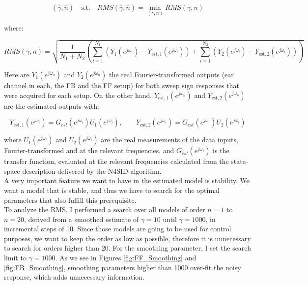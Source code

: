 \[(\hat{\gamma},\hat{n}) \quad\text{s.t.}\quad RMS(\hat{\gamma},\hat{n}) = \min\limits_{(\gamma,n)} RMS(\gamma,n)\]

where:

\[RMS(\gamma,n) = \sqrt{ \frac{1}{N_1 + N_2}\left(\sum\limits_{i=1}^{N_1}(Y_1(e^{j\omega_i})-Y_{\text{est},1}(e^{j\omega_i}))+\sum\limits_{i=1}^{N_2}(Y_2(e^{j\omega_i})-Y_{\text{est},2}(e^{j\omega_i}))\right)}\]

Here are $Y_1(e^{j\omega_n})$ and $Y_2(e^{j\omega_n})$ the real Fourier-transformed outputs (ear channel in each, the FB and the FF setup) for both sweep sign responses that were acquired for each setup. On the other hand, $Y_{\text{est},1}(e^{j\omega_n})$ and $Y_{\text{est},2}(e^{j\omega_n})$ are the estimated outputs with:

\[Y_{\text{est},1}(e^{j\omega_i}) = G_{est}(e^{j\omega_i})U_1(e^{j\omega_i}), \qquad Y_{\text{est},2}(e^{j\omega_i}) = G_{est}(e^{j\omega_i})U_2(e^{j\omega_i})\]

where $U_1(e^{j\omega_i})$ and $U_2(e^{j\omega_i})$ are the real measurements of the data inputs, Fourier-transformed and at the relevant frequencies, and $G_{est}(e^{j\omega_i})$ is the transfer function, evaluated at the relevant frequencies calculated from the state-space description delivered by the N4SID-algorithm.\\

A very important feature we want to have in the estimated model is stability. We want a model that is stable, and thus we have to search for the optimal parameters that also fulfill this prerequisite.\\

To analyze the RMS, I performed a search over all models of order $n=1$ to $n = 20$, derived from a smoothed estimate of $\gamma = 10$ until $\gamma = 1000$, in incremental steps of 10. Since those models are going to be used for control purposes, we want to keep the order as low as possible, therefore it is unnecessary to search for orders higher than 20. For the smoothing parameter, I set the search limit to $\gamma = 1000$. As we see in Figures \ref{fig:FF_Smoothing} and \ref{fig:FB_Smoothing}, smoothing parameters higher than 1000 over-fit the noisy response, which adds unnecessary information. \\

